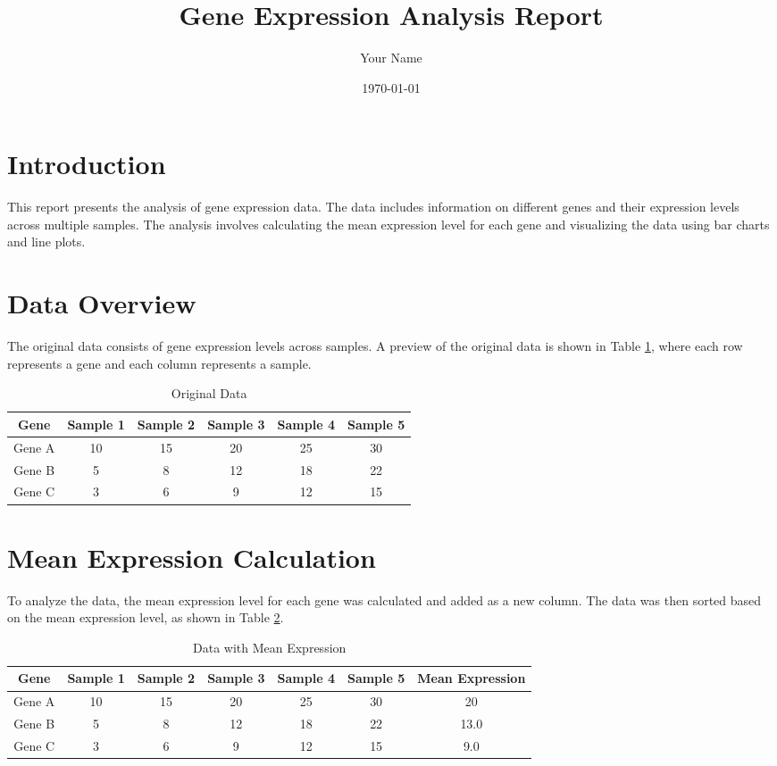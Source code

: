 \documentclass{article}
\title{Gene Expression Analysis Report}
\author{Your Name}
\date{\today}
\begin{document}
\maketitle

\section{Introduction}
This report presents the analysis of gene expression data. The data includes information on different genes and their expression levels across multiple samples. The analysis involves calculating the mean expression level for each gene and visualizing the data using bar charts and line plots.

\section{Data Overview}
The original data consists of gene expression levels across samples. A preview of the original data is shown in Table \ref{tab:original_data}, where each row represents a gene and each column represents a sample.

\begin{table}[H]
\centering
\caption{Original Data}
\label{tab:original_data}
\begin{tabular}{|c|c|c|c|c|c|}
\hline
Gene & Sample 1 & Sample 2 & Sample 3 & Sample 4 & Sample 5 \\ \hline
Gene A & 10 & 15 & 20 & 25 & 30 \\ \hline
Gene B & 5 & 8 & 12 & 18 & 22 \\ \hline
Gene C & 3 & 6 & 9 & 12 & 15 \\ \hline
\end{tabular}
\end{table}

\section{Mean Expression Calculation}
To analyze the data, the mean expression level for each gene was calculated and added as a new column. The data was then sorted based on the mean expression level, as shown in Table \ref{tab:mean_expression_data}.

\begin{table}[H]
\centering
\caption{Data with Mean Expression}
\label{tab:mean_expression_data}
\begin{tabular}{|c|c|c|c|c|c|c|}
\hline
Gene & Sample 1 & Sample 2 & Sample 3 & Sample 4 & Sample 5 & Mean Expression \\ \hline
Gene A & 10 & 15 & 20 & 25 & 30 & 20 \\ \hline
Gene B & 5 & 8 & 12 & 18 & 22 & 13.0 \\ \hline
Gene C & 3 & 6 & 9 & 12 & 15 & 9.0 \\ \hline
\end{tabular}
\end{table}
\end{document}

